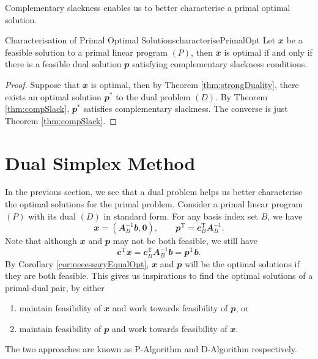 \documentclass[math, code]{amznotes}
\theoremstyle{remark}
\begin{document}
Complementary slackness enables us to better characterise a primal optimal solution.
\begin{probox}{Characterisation of Primal Optimal Solutions}{characterisePrimalOpt}
    Let $\mathbfit{x}$ be a feasible solution to a primal linear program $(P)$, then $\mathbfit{x}$ is optimal if and only if there is a feasible dual solution $\mathbfit{p}$ satisfying complementary slackness conditions.
    \tcblower
    \begin{proof}
        Suppose that $\mathbfit{x}$ is optimal, then by Theorem \ref{thm:strongDuality}, there exists an optimal solution $\mathbfit{p}^*$ to the dual problem $(D)$. By Theorem \ref{thm:compSlack}, $\mathbfit{p}^*$ satisfies complementary slackness. The converse is just Theorem \ref{thm:compSlack}.
    \end{proof}
\end{probox}
\section{Dual Simplex Method}
In the previous section, we see that a dual problem helps us better characterise the optimal solutions for the primal problem. Consider a primal linear program $(P)$ with its dual $(D)$ in standard form. For any basis index set $B$, we have 
\begin{equation*}
    \mathbfit{x} = \left(\mathbfit{A}_B^{-1}\mathbfit{b}, \mathbf{0}\right), \qquad \mathbfit{p}^{\mathrm{T}} = \mathbfit{c}_B^{\mathrm{T}}\mathbfit{A}_B^{-1}.
\end{equation*}
Note that although $\mathbfit{x}$ and $\mathbfit{p}$ may not be both feasible, we still have
\begin{equation*}
    \mathbfit{c}^{\mathrm{T}}\mathbfit{x} = \mathbfit{c}_B^{\mathrm{T}}\mathbfit{A}_B^{-1}\mathbfit{b} = \mathbfit{p}^{\mathrm{T}}\mathbfit{b}.
\end{equation*}
By Corollary \ref{cor:necessaryEqualOpt}, $\mathbfit{x}$ and $\mathbfit{p}$ will be the optimal solutions if they are both feasible. This gives us inspirations to find the optimal solutions of a primal-dual pair, by either 
\begin{enumerate}
    \item maintain feasibility of $\mathbfit{x}$ and work towards feasibility of $\mathbfit{p}$, or
    \item maintain feasibility of $\mathbfit{p}$ and work towards feasibility of $\mathbfit{x}$.
\end{enumerate}
The two approaches are known as P-Algorithm and D-Algorithm respectively.
\end{document}

